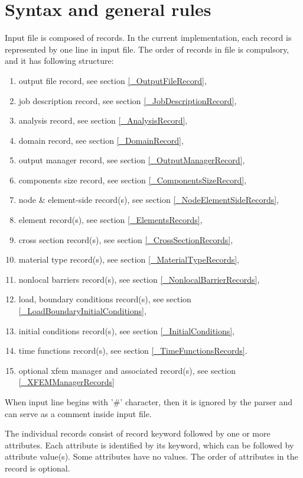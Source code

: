 \documentclass[a4paper]{article}
\begin{document}
\section{Syntax and general rules}

Input file is composed of records. In the current implementation, each record is represented by one line in input file.
The order of records in file is compulsory, and it has following structure:
\begin{enumerate}
\item output file record, see section \ref{_OutputFileRecord},
\item job description record, see section \ref{_JobDescriptionRecord},
\item analysis record, see section \ref{_AnalysisRecord},
\item domain record, see section \ref{_DomainRecord},
\item output manager record, see section \ref{_OutputManagerRecord},
\item components size record, see section \ref{_ComponentsSizeRecord},
\item node \& element-side  record(s), see section \ref{_NodeElementSideRecords},
\item element record(s), see section \ref{_ElementsRecords},
\item cross section record(s), see section \ref{_CrossSectionRecords},
\item material type  record(s), see section \ref{_MaterialTypeRecords},
\item nonlocal barriers record(s), see section \ref{_NonlocalBarrierRecords},
\item load, boundary  conditions record(s), see section
  \ref{_LoadBoundaryInitialConditions},
\item initial conditions record(s), see section \ref{_InitialConditions},
\item time functions record(s), see section \ref{_TimeFunctionsRecords}.
\item optional xfem manager and associated record(s), see section \ref{_XFEMManagerRecords}
\end{enumerate}
When input line begins with '\#' character, then it is ignored  by the parser and
can serve as a comment inside input file.

The individual records consist of record keyword followed by one or more attributes. Each attribute is identified by
its keyword, which can be followed by attribute value(s). Some attributes have no values.
The order of attributes in the record is optional.
\end{document}
